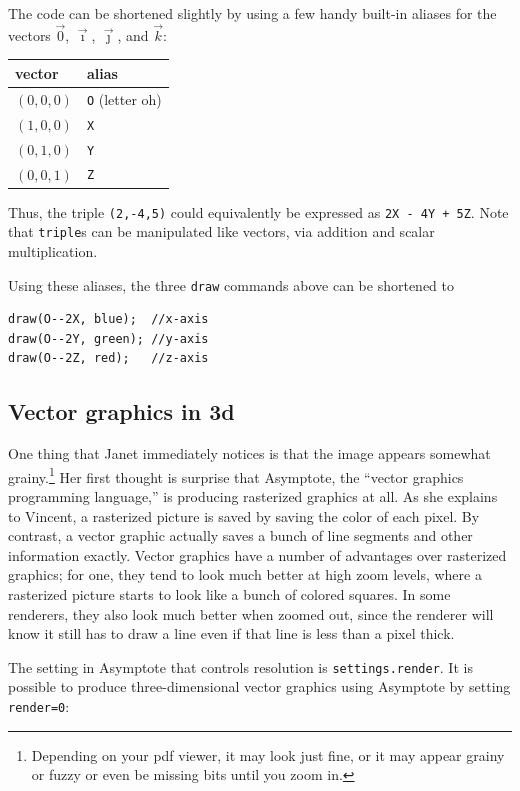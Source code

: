 \documentclass{article}
\begin{document}
\noindent
The code can be shortened slightly by using a few handy built-in aliases for the vectors 
$\vec{0}$, $\vec{\imath}$, $\vec{\jmath}$, and $\vec{k}$:
\begin{center}
\begin{tabular}{l l} \toprule
vector & alias \\ \midrule
$(0,0,0)$ & \texttt{O} (letter oh) \\
$(1,0,0)$ & \texttt{X} \\
$(0,1,0)$ & \texttt{Y} \\
$(0,0,1)$ & \texttt{Z} \\ \bottomrule
\end{tabular}
\end{center}
Thus, the triple \lstinline!(2,-4,5)! could equivalently be expressed as \lstinline!2X - 4Y + 5Z!.
Note that \lstinline!triple!s can be manipulated like vectors, via addition and scalar multiplication.

Using these aliases, the three \lstinline!draw! commands above can be shortened to
\begin{lstlisting}
draw(O--2X, blue);  //x-axis
draw(O--2Y, green); //y-axis
draw(O--2Z, red);   //z-axis
\end{lstlisting}

%
\subsection{Vector graphics in 3d}
One thing that Janet immediately notices is that the image appears somewhat grainy.\footnote{
Depending on your pdf viewer, it may look just fine, or it may appear grainy or fuzzy or even be missing 
bits until you zoom in.}
Her first thought is surprise that Asymptote, the ``vector graphics programming language,''
is producing rasterized graphics at all.  As she explains to Vincent, a rasterized picture is saved 
by saving the color of each pixel.  By contrast, a vector graphic actually saves a bunch of line segments 
and other information exactly.  Vector graphics have a number of advantages over rasterized graphics;
for one, they 
tend to look much better at high zoom levels, where a rasterized picture starts to look like a bunch of 
colored squares.  In some renderers, they also look much better when zoomed out, since the renderer 
will know it still has to draw a line even if that line is less than a pixel thick.

The setting in Asymptote that controls resolution is \lstinline!settings.render!.
It is possible to produce three-dimensional vector graphics using Asymptote by setting 
\lstinline!render=0!:
\end{document}
